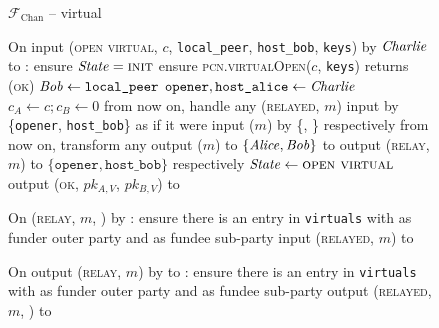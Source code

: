 \begin{figure}[H]
  \begin{systembox}{$\mathcal{F}_{\mathrm{Chan}}$ -- virtual}
    \begin{algorithmic}[1]
      \State On input (\textsc{open virtual}, $c$, \texttt{local\_peer},
      \texttt{host\_bob}, \texttt{keys}) by $\mathit{Charlie}$ to \alice:
      \label{code:functionality:chan:skeleton:virtual:fund-you}
      \Indent
        \State ensure $\mathit{State} = \textsc{init}$
        \State ensure \textsc{pcn.virtualOpen}($c$, \texttt{keys}) returns
        (\textsc{ok})
        \label{code:functionality:chan:skeleton:virtual:ln}
        \State $\mathit{Bob} \gets \texttt{local\_peer}$
        \State $\mathtt{opener}, \texttt{host\_alice} \gets \mathit{Charlie}$
        \State $c_A \gets c; c_B \gets 0$
        \State from now on, handle any (\textsc{relayed}, $m$) input by
        \{\texttt{opener}, \texttt{host\_bob}\} as if it were input ($m$) by
        \{\alice, \bob\} respectively
        \State from now on, transform any output ($m$) to $\{\mathit{Alice}, \mathit{Bob}\}$ to
        output (\textsc{relay}, $m$) to $\{\mathtt{opener},
        \texttt{host\_bob}\}$ respectively
        \State $\mathit{State} \gets \textsc{open virtual}$
        \State output (\textsc{ok}, $pk_{A, V}$, $pk_{B, V}$) to \charlie
      \EndIndent
      \Statex

      \State On (\textsc{relay}, $m$, \charlie) by \alice:
      \Indent
        \State ensure there is an entry in \texttt{virtuals} with \alice as funder
        outer party and \charlie as fundee sub-party
        \label{code:functionality:chan:skeleton:virtual:relay:input:start}
        \State input (\textsc{relayed}, $m$) to \charlie
        \label{code:functionality:chan:skeleton:virtual:relay:input:end}
      \EndIndent
      \Statex

      \State On output (\textsc{relay}, $m$) by \charlie to \alice:
      \Indent
        \State ensure there is an entry in \texttt{virtuals} with \alice as funder
        outer party and \charlie as fundee sub-party 
        \label{code:functionality:chan:skeleton:virtual:relay:output:start}
        \State output (\textsc{relayed}, $m$, \charlie) to \environment
        \label{code:functionality:chan:skeleton:virtual:relay:output:end}
      \EndIndent
    \end{algorithmic}
  \end{systembox}
  \caption{}
  \label{code:functionality:chan:skeleton:virtual}
\end{figure}

